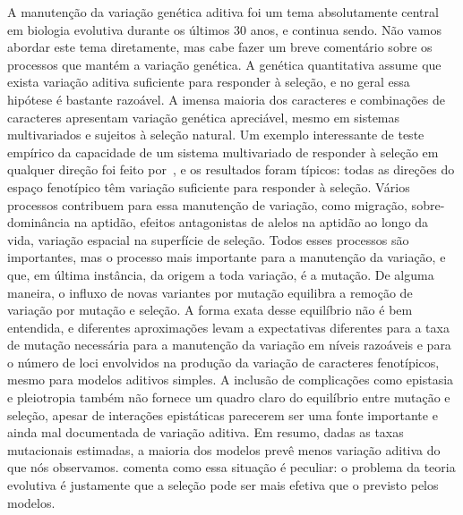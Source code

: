 \begin{refsection}
A manutenção da variação genética aditiva foi um tema absolutamente central em
biologia evolutiva durante os últimos 30 anos, e continua sendo. Não vamos
abordar este tema diretamente, mas cabe fazer um breve comentário sobre os
processos que mantém a variação genética. A genética quantitativa assume que
exista variação aditiva suficiente para responder à seleção, e no geral essa
hipótese é bastante razoável. A imensa maioria dos caracteres e combinações de
caracteres apresentam variação genética apreciável, mesmo em sistemas
multivariados e sujeitos à seleção natural. Um exemplo interessante de teste
empírico da capacidade de um sistema multivariado de responder à seleção em
qualquer direção foi feito por~\textcite{Hine2014-ps}, e os resultados foram
típicos: todas as direções do espaço fenotípico têm variação suficiente para
responder à seleção. Vários processos contribuem para essa manutenção de
variação, como migração, sobre-dominância na aptidão, efeitos antagonistas de
alelos na aptidão ao longo da vida, variação espacial na superfície de
seleção. Todos esses processos são importantes, mas o processo mais importante
para a manutenção da variação, e que, em última instância, da origem a toda
variação, é a mutação. De alguma maneira, o influxo de novas variantes por
mutação equilibra a remoção de variação por mutação e seleção. A forma exata
desse equilíbrio não é bem entendida, e diferentes aproximações levam a
expectativas diferentes para a taxa de mutação necessária para a manutenção da
variação em níveis razoáveis e para o número de loci envolvidos na produção da
variação de caracteres fenotípicos, mesmo para modelos aditivos simples. A
inclusão de complicações como epistasia e pleiotropia também não fornece um
quadro claro do equilíbrio entre mutação e seleção, apesar de interações
epistáticas parecerem ser uma fonte importante e ainda mal documentada de
variação aditiva. Em resumo, dadas as taxas mutacionais estimadas, a maioria
dos modelos prevê menos variação aditiva do que nós observamos.
\textcite{Rice2004-jf} comenta como essa situação é peculiar: o problema da
teoria evolutiva é justamente que a seleção pode ser mais efetiva que o
previsto pelos modelos.


\end{refsection}
